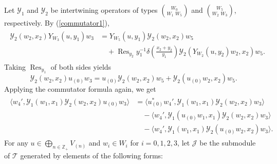 \documentclass[9pt]{amsart}
\newcommand{\Z}{\mathbb{Z}}      %
\newcommand{\J}{\mathcal{J}}
\begin{document}
Let $\mathcal{Y}_{1}$ and $\mathcal{Y}_{2}$ be intertwining operators of types $\binom{W_{0}}{W_{1}\,\,W_{5}}$ and $\binom{W_{5}}{W_{2}\,\,W_{3}}$, respectively. By (\ref{commutator1}),
\begin{align}\label{commutator}
    \begin{split}
        \mathcal{Y}_{2}(w_{2}, x_{2}) Y_{W_{3}}(u, y_{1}) w_{3} &= Y_{W_{5}}(u, y_{1}) \mathcal{Y}_{2}(w_{2}, x_{2}) w_{5} \\
        &\quad + \operatorname{Res}_{y_{2}} y_{1}^{-1} \delta\left(\frac{x_{2} + y_{2}}{y_{1}}\right) \mathcal{Y}_{2}(Y_{W_{2}}(u, y_{2}) w_{2}, x_{2}) w_{5}.
    \end{split}
\end{align}
Taking $\operatorname{Res}_{y_{1}}$ of both sides yields
\[
\mathcal{Y}_{2}(w_{2}, x_{2}) u_{(0)} w_{3} = u_{(0)} \mathcal{Y}_{2}(w_{2}, x_{2}) w_{5} + \mathcal{Y}_{2}(u_{(0)} w_{2}, x_{2}) w_{5}.
\]
Applying the commutator formula again, we get
\begin{align}\label{relatione}
    \begin{split}
        \langle w_{4}', \mathcal{Y}_{1}(w_{1}, x_{1}) \mathcal{Y}_{2}(w_{2}, x_{2}) u_{(0)} w_{3} \rangle
        &= \langle u_{(0)}^{*} w_{4}', \mathcal{Y}_{1}(w_{1}, x_{1}) \mathcal{Y}_{2}(w_{2}, x_{2}) w_{3} \rangle \\
        &\quad - \langle w_{4}', \mathcal{Y}_{1}(u_{(0)} w_{1}, x_{1}) \mathcal{Y}_{2}(w_{2}, x_{2}) w_{3} \rangle \\
        &\quad - \langle w_{4}', \mathcal{Y}_{1}(w_{1}, x_{1}) \mathcal{Y}_{2}(u_{(0)} w_{2}, x_{2}) w_{3} \rangle.
    \end{split}
\end{align}
For any $u \in \bigoplus_ {n\in \Z_+} V_{(n)}$ and $w_i \in W_i$ for $i = 0,1,2,3$, let $\J$ be the submodule of $\mathcal{T}$ generated by elements of the following forms:
\end{document}
